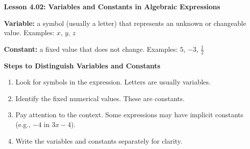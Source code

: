 \begin{center}
\textbf{Lesson 4.02: Variables and Constants in Algebraic Expressions}
\end{center}

\vspace*{-1.5ex}

\noindent \textbf{Variable:} a symbol (usually a letter) that represents an unknown or changeable value. Examples: $x$, $y$, $z$

\noindent \textbf{Constant:} a fixed value that does not change. Examples: $5$, $-3$, $\frac{1}{2}$

\noindent \textbf{Steps to Distinguish Variables and Constants}
\begin{enumerate}
    \item Look for symbols in the expression. Letters are usually variables.  
    \item Identify the fixed numerical values. These are constants.  
    \item Pay attention to the context. Some expressions may have implicit constants (e.g., $-4$ in $3x - 4$).  
    \item Write the variables and constants separately for clarity.  
\end{enumerate}
